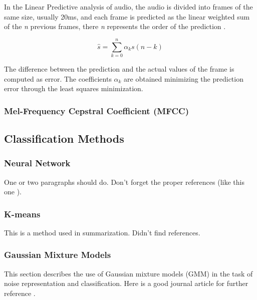 \documentclass[12pt]{article}
\begin{document}
In the Linear Predictive analysis of audio, the audio is divided into frames of the same size, usually 20ms, and each frame is predicted as the linear weighted sum of the \textit{n} previous frames, there \textit{n} represents the order of the prediction \cite{Rabiner:1993:FSR:153687}. 

\begin{equation}
	\hat{s} = \sum_{k=0}^{n} \alpha_ks(n-k)
	\label{eq:lpc}
\end{equation}


The difference between the prediction and the actual values of the frame is computed as error. The coefficients $\alpha_k$ are obtained minimizing the prediction error through the least squares minimization.


\subsubsection{Mel-Frequency Cepstral Coefficient (MFCC)} \label{class:mfcc}



\subsection{Classification Methods} \label{class:meth}

\subsubsection{Neural Network} \label{class:nn}

One or two paragraphs should do. Don't forget the proper references (like this one \cite{lei2014novel}).

\subsubsection{K-means} \label{class:kmeans}

This is a method used in summarization. Didn't find references.

\subsubsection{Gaussian Mixture Models} \label{class:gmm}

This section describes the use of Gaussian mixture models (GMM) in the task of noise representation and classification. Here is a good journal article for further reference \cite{reynolds1995robust}.
\end{document}
